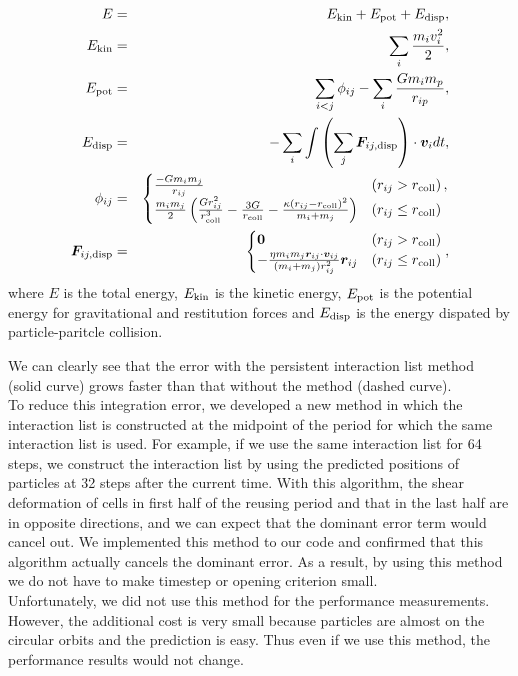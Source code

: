 \documentclass[Afour,sageh,times]{sagej}
\newcommand{\rev}[1]{{#1}}
\begin{document}
\rev{
\begin{eqnarray}
  E &=& E_{\rm kin} + E_{\rm pot} + E_{\rm disp}, \label{eq:etot} \\
  E_{\rm kin} &=& \sum_{i} \frac{m_i v_i^2}{2}, \\
  E_{\rm pot} &=& \sum_{i<j} \phi_{ij} - \sum_{i} \frac{G m_i m_p}{r_{ip}}, \\
  E_{\rm disp} &=& -\sum_{i} \int \left(\sum_{j} \bm F_{ij, {\rm disp}} \right) \cdot \bm v_{i} dt, \\
  \phi_{ij} &=& \begin{cases} \frac{-G m_i m_j}{r_{ij}} & \left(r_{ij} > r_\text{coll} \right), \\
    \frac{m_i m_j}{2} \left( \frac{G r_{ij}^2}{r_{\rm coll}^3} - \frac{3 G}{r_{\rm coll}} - \frac{\kappa \left( r_{ij} - r_{\rm coll}\right)^2 }{m_i + m_j} \right) & \left( r_{ij} \le r_\text{coll} \right)
  \end{cases} \\
  \bm F_{ij, {\rm disp}} &=& \begin{cases}
    \bm 0 & \left(r_{ij} > r_\text{coll} \right) \\
   - \frac{\eta m_i m_j \bm r_{ij} \cdot \bm v_{ij}}{ \left(m_i + m_j \right)r_{ij}^2 } \bm r_{ij} & \left( r_{ij} \le r_\text{coll} \right) 
  \end{cases}, \label{eq:fij}
\end{eqnarray}
where $E$ is the total energy, $E_{\rm kin}$ is the kinetic energy,
$E_{\rm pot}$ is the potential energy for gravitational and
restitution forces and $E_{\rm disp}$ is the energy dispated by
particle-paritcle collision.}

\rev{ We can clearly see that the error with the persistent
  interaction list method (solid curve) grows faster than that without
  the method (dashed curve). \\ To reduce this integration error, we
  developed a new method in which the interaction list is constructed
  at the midpoint of the period for which the same interaction list is
  used. For example, if we use the same interaction list for 64 steps,
  we construct the interaction list by using the predicted positions
  of particles at 32 steps after the current time. With this
  algorithm, the shear deformation of cells in first half of the
  reusing period and that in the last half are in opposite directions,
  and we can expect that the dominant error term would cancel out. We
  implemented this method to our code and confirmed that this
  algorithm actually cancels the dominant error.  As a result, by
  using this method we do not have to make timestep or opening
  criterion small. \\ Unfortunately, we did not use this method for
  the performance measurements. However, the additional cost is very
  small because particles are almost on the circular orbits and the
  prediction is easy. Thus even if we use this method, the performance
  results would not change. \\ }
\end{document}
